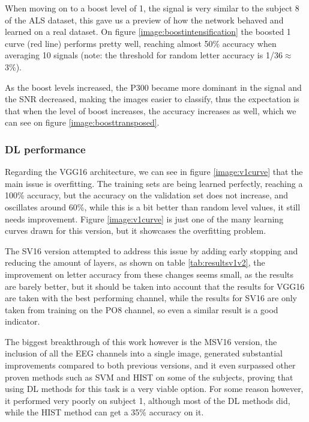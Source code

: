 \documentclass[conference]{IEEEtran}
\begin{document}
When moving on to a boost level of 1, the signal is very similar to the subject 8 of the ALS dataset, this gave us a preview of how the network behaved and learned on a real dataset. On figure \ref{image:boostintensification} the boosted 1 curve (red line) performs pretty well, reaching almost 50\% accuracy when averaging 10 signals (note: the threshold for random letter accuracy is 1/36$\approx$3\%).

As the boost levels increased, the P300 became more dominant in the signal and the SNR decreased, making the images easier to classify, thus the expectation is that when the level of boost increases, the accuracy increases as well, which we can see on figure \ref{image:boosttransposed}.

\subsubsection{DL performance}

Regarding the VGG16 architecture, we  can see in figure \ref{image:v1curve} that the main issue is overfitting. The training sets are being learned perfectly, reaching a 100\% accuracy, but the accuracy on the validation set does not increase, and oscillates around 60\%, while this is a bit better than random level values, it still needs improvement. Figure \ref{image:v1curve} is just one of the many learning curves drawn for this version, but it showcases the overfitting problem.

The SV16 version attempted to address this issue by adding early stopping and reducing the amount of layers, as shown on table \ref{tab:resultsv1v2}, the improvement on letter accuracy from these changes seems small, as the results are barely better, but it should be taken into account that the results for VGG16 are taken with the best performing channel, while the results for SV16 are only taken from training on the PO8 channel, so even a similar result is a good indicator.

The biggest breakthrough of this work however is the MSV16 version, the inclusion of all the EEG channels into a single image, generated substantial improvements compared to both previous versions, and it even surpassed other proven methods such as SVM and HIST on some of the subjects, proving that using DL methods for this task is a very viable option. For some reason however, it performed very poorly on subject 1, although most of the DL methods did, while the HIST method can get a 35\% accuracy on it.
\end{document}
